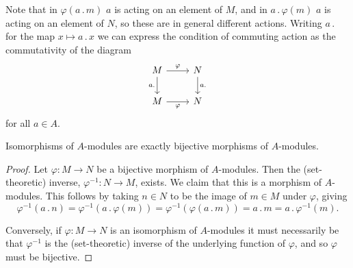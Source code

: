 \documentclass[fleqn]{NotesClass}
\newcommand{\action}{\mathbin{.}}
\begin{document}
    Note that in \(\varphi(a \action m)\) \(a\) is acting on an element of \(M\), and in \(a \action \varphi(m)\) \(a\) is acting on an element of \(N\), so these are in general different actions.
    Writing \(a \action {}\) for the map \(x \mapsto a \action x\) we can express the condition of commuting action as the commutativity of the diagram
    \begin{equation}
        \begin{tikzcd}
            M \arrow[r, "\varphi"] \arrow[d, "a \action {}"'] & N \arrow[d, "a \action {}"]\\
            M \arrow[r, "\varphi"'] & N
        \end{tikzcd}
    \end{equation}
    for all \(a \in A\).
    
    \begin{lma}{}{}
        Isomorphisms of \(A\)-modules are exactly bijective morphisms of \(A\)-modules.
        \begin{proof}
            Let \(\varphi \colon M \to N\) be a bijective morphism of \(A\)-modules.
            Then the (set-theoretic) inverse, \(\varphi^{-1} \colon N \to M\), exists.
            We claim that this is a morphism of \(A\)-modules.
            This follows by taking \(n \in N\) to be the image of \(m \in M\) under \(\varphi\), giving
            \begin{equation}
                \varphi^{-1}(a \action n) = \varphi^{-1}(a \action \varphi(m)) = \varphi^{-1}(\varphi(a \action m)) = a \action m = a \action \varphi^{-1}(m).
            \end{equation}
            
            Conversely, if \(\varphi \colon M \to N\) is an isomorphism of \(A\)-modules it must necessarily be that \(\varphi^{-1}\) is the (set-theoretic) inverse of the underlying function of \(\varphi\), and so \(\varphi\) must be bijective.
        \end{proof}
    \end{lma}
    
\end{document}
